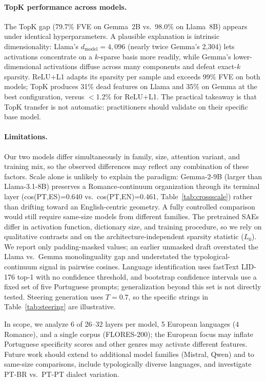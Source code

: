 \documentclass[runningheads]{llncs}
\begin{document}
\paragraph{TopK performance across models.}
\label{sec:topk-gap}
The TopK gap (79.7\% FVE on Gemma~2B vs.\ 98.0\% on Llama~8B) appears under identical hyperparameters. A plausible explanation is intrinsic dimensionality: Llama's $d_\text{model}{=}4{,}096$ (nearly twice Gemma's 2,304) lets activations concentrate on a $k$-sparse basis more readily, while Gemma's lower-dimensional activations diffuse across many components and defeat exact-$k$ sparsity. ReLU+L1 adapts its sparsity per sample and exceeds 99\% FVE on both models; TopK produces 31\% dead features on Llama and 35\% on Gemma at the best configuration, versus $<$1.2\% for ReLU+L1. The practical takeaway is that TopK transfer is not automatic: practitioners should validate on their specific base model.

\paragraph{Limitations.}
\label{sec:limitations}

Our two models differ simultaneously in family, size, attention variant, and training mix, so the observed differences may reflect any combination of these factors. Scale alone is unlikely to explain the paradigm: Gemma-2-9B (larger than Llama-3.1-8B) preserves a Romance-continuum organization through its terminal layer (cos(PT,ES)=0.640 vs.\ cos(PT,EN)=0.461, Table~\ref{tab:crossscale}) rather than drifting toward an English-centric geometry. A fully controlled comparison would still require same-size models from different families. The pretrained SAEs differ in activation function, dictionary size, and training procedure, so we rely on qualitative contrasts and on the architecture-independent sparsity statistic ($L_0$). We report only padding-masked values; an earlier unmasked draft overstated the Llama vs.\ Gemma monolinguality gap and understated the typological-continuum signal in pairwise cosines. Language identification uses fastText LID-176 top-1 with no confidence threshold, and bootstrap confidence intervals use a fixed set of five Portuguese prompts; generalization beyond this set is not directly tested. Steering generation uses $T{=}0.7$, so the specific strings in Table~\ref{tab:steering} are illustrative.

In scope, we analyze 6 of 26--32 layers per model, 5 European languages (4 Romance), and a single corpus (FLORES-200); the European focus may inflate Portuguese specificity scores and other genres may activate different features. Future work should extend to additional model families (Mistral, Qwen) and to same-size comparisons, include typologically diverse languages, and investigate PT-BR vs.\ PT-PT dialect variation.
\end{document}
